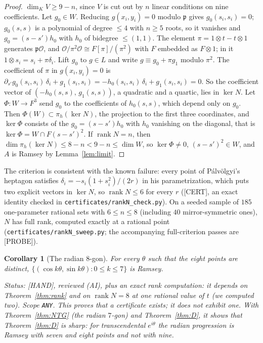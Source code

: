 \documentclass[11pt]{amsart}
\newcommand{\st}[1]{\textsf{[#1]}}
\theoremstyle{plain}
\newtheorem{corollary}[theorem]{Corollary}
\theoremstyle{definition}
\begin{document}
\begin{proof}
$\dim_KV\ge9-n$, since $V$ is cut out by $n$ linear conditions on nine coefficients. Let $g_0\in W$. Reducing
$g(x_i,y_i)=0$ modulo $\mathfrak p$ gives $g_0(s_i,s_i)=0$; $g_0(s,s)$ is a polynomial of degree $\le4$ with
$n\ge5$ roots, so it vanishes and $g_0=(s-s')h_0$ with $h_0$ of bidegree $\le(1,1)$. The element
$\pi=1\otimes t-t\otimes1$ generates $\mathfrak p\mathcal O$, and $\mathcal O/\pi^2\mathcal O\cong F[\pi]/(\pi^2)$
with $F$ embedded as $F\otimes1$; in it $1\otimes s_i=s_i+\pi\delta_i$. Lift $g_0$ to $g\in L$ and write
$g\equiv g_0+\pi g_1$ modulo $\pi^2$. The coefficient of $\pi$ in $g(x_i,y_i)=0$ is
$\partial_{s'}g_0(s_i,s_i)\,\delta_i+g_1(s_i,s_i)=-h_0(s_i,s_i)\,\delta_i+g_1(s_i,s_i)=0$. So the coefficient
vector of $(-h_0(s,s),\,g_1(s,s))$, a quadratic and a quartic, lies in $\ker N$. Let
$\Phi:W\to F^3$ send $g_0$ to the coefficients of $h_0(s,s)$, which depend only on $g_0$. Then
$\Phi(W)\subset\pi_h(\ker N)$, the projection to the first three coordinates, and $\ker\Phi$ consists of the
$g_0=(s-s')h_0$ with $h_0$ vanishing on the diagonal, that is $\ker\Phi=W\cap F(s-s')^2$. If
$\operatorname{rank}N=n$, then $\dim\pi_h(\ker N)\le8-n<9-n\le\dim W$, so $\ker\Phi\ne0$, $(s-s')^2\in W$, and $A$ is
Ramsey by Lemma~\ref{lem:limit}.
\end{proof}

\noindent The criterion is consistent with the known failure: every point of P\'alv\"olgyi's heptagon
\cite{Palvolgyi} satisfies $\delta_i=-s_i(1+s_i^2)/(2r)$ in his parametrization, which puts two explicit
vectors in $\ker N$, so $\operatorname{rank}N\le6$ for every $r$ (\st{CERT}, an exact identity checked in
\texttt{certificates/rankN\_check.py}). On a seeded sample of $185$ one-parameter rational sets with
$6\le n\le8$ (including $40$ mirror-symmetric ones), $N$ has full rank, computed exactly at a rational
point (\texttt{certificates/rankN\_sweep.py}; the accompanying full-criterion passes are \st{PROBE}).

\begin{corollary}[The radian $8$-gon]\label{cor:radian8}
For every $\theta$ such that the eight points are distinct, $\{(\cos k\theta,\sin k\theta):0\le k\le7\}$ is
Ramsey.

\smallskip\noindent\emph{Status:} \st{HAND}, reviewed (AI), plus an exact rank computation: it
depends on Theorem~\ref{thm:rank} and on $\operatorname{rank}N=8$ at one rational value of $t$ (we
computed two). Scope \texttt{ANY}. This proves that a certificate exists; it does not exhibit one.
With Theorem~\ref{thm:NTG} (the radian $7$-gon) and Theorem~\ref{thm:D}, it shows that Theorem~\ref{thm:D}
is sharp: for transcendental $e^{i\theta}$ the radian progression is Ramsey with seven and eight points
and not with nine.
\end{corollary}
\end{document}

